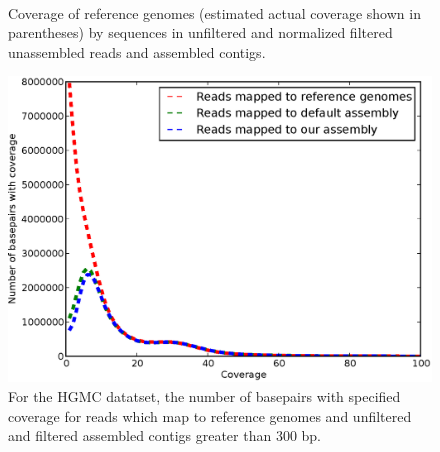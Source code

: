 \documentclass{pnastwo}
\begin{document}
\renewcommand{\thepage}{S\arabic{page}}  
\renewcommand{\thesection}{S\arabic{section}}   
\renewcommand{\thetable}{S\arabic{table}}   
\renewcommand{\thefigure}{S\arabic{figure}}
\





\begin{figure}
\caption{Coverage of reference genomes (estimated actual coverage shown in parentheses) by sequences in unfiltered and normalized filtered unassembled reads and assembled contigs.}
\label{coverage1}
\end{figure}


\begin{figure}
\centerline{\includegraphics[width=.7\textwidth]{./figures/coverage.eps}}
\caption{For the HGMC datatset, the number of basepairs with specified coverage for reads which
  map to reference genomes and unfiltered and filtered assembled
  contigs greater than 300 bp.}
\label{coveragehmp}
\end{figure}
\end{document}
